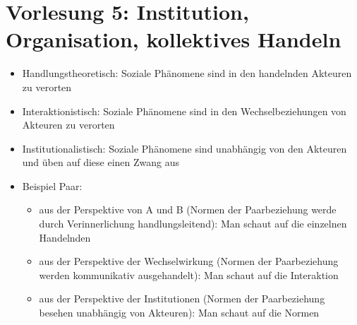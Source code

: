 \documentclass{scrartcl}
\begin{document}
\section*{Vorlesung 5: Institution, Organisation, kollektives Handeln}
\begin{itemize}
    \item
        Handlungstheoretisch: Soziale Phänomene sind in den handelnden Akteuren zu verorten
    \item
        Interaktionistisch: Soziale Phänomene sind in den Wechselbeziehungen von Akteuren zu verorten
    \item
        Institutionalistisch: Soziale Phänomene sind unabhängig von den Akteuren und üben auf diese einen Zwang aus
    \item
        Beispiel Paar:
        \begin{itemize}
            \item
                aus der Perspektive von A und B (Normen der Paarbeziehung werde durch Verinnerlichung handlungsleitend): Man schaut auf die einzelnen Handelnden
            \item
                aus der Perspektive der Wechselwirkung (Normen der Paarbeziehung werden kommunikativ ausgehandelt): Man schaut auf die Interaktion
            \item
                aus der Perspektive der Institutionen (Normen der Paarbeziehung besehen unabhängig von Akteuren): Man schaut auf die Normen
        \end{itemize}
\end{itemize}
\end{document}

